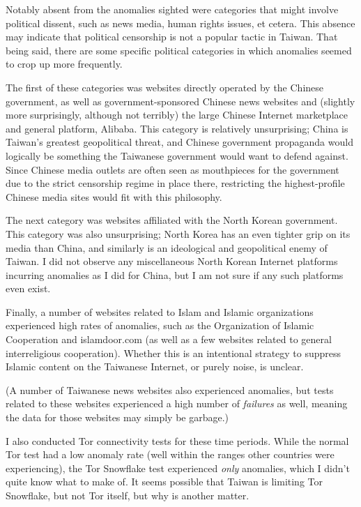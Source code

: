 Notably absent from the anomalies sighted were categories that might involve political dissent, such as news media, human rights issues, et cetera. This 
absence may indicate that political censorship is not a popular tactic in Taiwan. That being said, there are some specific political categories in which
anomalies seemed to crop up more frequently.

The first of these categories was websites directly operated by the Chinese government, as well as government-sponsored Chinese news websites and (slightly
more surprisingly, although not terribly) the large Chinese Internet marketplace and general platform, Alibaba. This category is relatively unsurprising;
China is Taiwan's greatest geopolitical threat, and Chinese government propaganda would logically be something the Taiwanese government would want to
defend against. Since Chinese media outlets are often seen as mouthpieces for the government due to the strict censorship regime in place there, restricting
the highest-profile Chinese media sites would fit with this philosophy.

The next category was websites affiliated with the North Korean government. This category was also unsurprising; North Korea has an even tighter grip on 
its media than China, and similarly is an ideological and geopolitical enemy of Taiwan. I did not observe any miscellaneous North Korean Internet platforms
incurring anomalies as I did for China, but I am not sure if any such platforms even exist.

Finally, a number of websites related to Islam and Islamic organizations experienced high rates of anomalies, such as the Organization of Islamic Cooperation
and islamdoor.com (as well as a few websites related to general interreligious cooperation). Whether this is an intentional strategy to suppress Islamic
content on the Taiwanese Internet, or purely noise, is unclear.

(A number of Taiwanese news websites also experienced anomalies, but tests related to these websites experienced a high number of \textit{failures} as well,
meaning the data for those websites may simply be garbage.)

I also conducted Tor connectivity tests for these time periods. While the normal Tor test had a low anomaly rate (well within the ranges other countries were
experiencing), the Tor Snowflake test experienced \textit{only} anomalies, which I didn't quite know what to make of. It seems possible that Taiwan is limiting
Tor Snowflake, but not Tor itself, but why is another matter.

